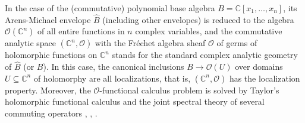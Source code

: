 \documentclass[12pt,reqno]{amsart}%
\theoremstyle{plain}
\numberwithin{theorem}{section} \numberwithin{equation}{section}
\numberwithin{lemma}{section}
\numberwithin{remark}{section}
\numberwithin{example}{section}
\numberwithin{proposition}{section}
\numberwithin{definition}{section}
\numberwithin{corollary}{section}
\begin{document}
In the case of the (commutative) polynomial base algebra $B=\mathbb{C}\left[
x_{1},\ldots,x_{n}\right]  $, its Arens-Michael envelope $\widehat{B}$
(including other envelopes) is reduced to the algebra $\mathcal{O}\left(
\mathbb{C}^{n}\right)  $ of all entire functions in $n$ complex variables, and
the commutative analytic space $\left(  \mathbb{C}^{n},\mathcal{O}\right)  $
with the Fr\'{e}chet algebra sheaf $\mathcal{O}$ of germs of holomorphic
functions on $\mathbb{C}^{n}$ stands for the standard complex analytic
geometry of $\widehat{B}$ (or $B$). In this case, the canonical inclusions
$B\rightarrow\mathcal{O}\left(  U\right)  $ over domains $U\subseteq
\mathbb{C}^{n}$ of holomorphy are all localizations, that is, $\left(
\mathbb{C}^{n},\mathcal{O}\right)  $ has the localization property. Moreover,
the $\mathcal{O}$-functional calculus problem is solved by Taylor's
holomorphic functional calculus and the joint spectral theory of several
commuting operators \cite{EP}, \cite{Tay}, \cite{Tay2}.
\end{document}
